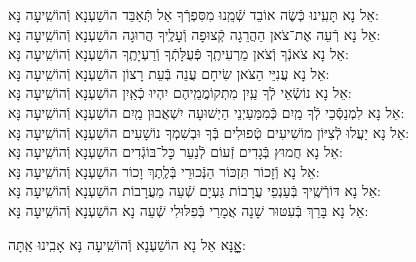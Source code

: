 \documentclass[twoside, openany, parskip=half, 11pt]{book}
\begin{document}
\begin{sometimes}
\begin{small}
אֵל נָא תָּעִֽינוּ כְּֿשֶׂה אוֹבֵד שְֿׁמֵֽנוּ מִסִּפְרְֿךָ אַל תְּֿאַבֵּד \hfill הוֹשַׁעְנָא וְֿהוֹשִֽׁיעָה נָּא: \\
אֵל נָא רְֿעֵה אֶת־צֹאן הַהֲרֵגָה קְֿצוּפָה וְֿעָלֶֽיךָ הֲרוּגָה \hfill הוֹשַׁעְנָא וְֿהוֹשִֽׁיעָה נָּא:\\
אֵל נָא צֹאנְֿךָ וְֿצֹאן מַרְעִיתֶֽךָ פְּֿעֻלָּתְֿךָ וְֿרַעְיָתֶֽךָ \hfill הוֹשַׁעְנָא וְֿהוֹשִֽׁיעָה נָּא:\\
אֵל נָא עֲנִיֵּי הַצֹּאן שִׂיחָם עֲנֵה בְּֿעֵת רָצוֹן \hfill הוֹשַׁעְנָא וְֿהוֹשִֽׁיעָה נָּא:\\
אֵל נָא נוֹשְֿׂאֵי לְֿךָ עַֽיִן מִתְקוֹמֲמֵֽיהֶם יִהְיוּ כְֿאַֽיִן \hfill הוֹשַׁעְנָא וְֿהוֹשִֽׁיעָה נָּא:\\
אֵל נָא לִמְנַסְּֿכֵי לְֿךָ מַֽיִם כְּֿמִמַּעַיְנֵי הַיְשׁוּעָה יִשְׁאֲבוּן מַֽיִם \hfill הוֹשַׁעְנָא וְֿהוֹשִֽׁיעָה נָּא:\\
אֵל נָא יַעֲלוּ לְֿצִיּוֹן מוֹשִׁיעִים טְֿפוּלִים בְּֿךָ וּבְשִׁמְךָ נוֹשָׁעִים \hfill הוֹשַׁעְנָא וְֿהוֹשִֽׁיעָה נָּא:\\
אֵל נָא חֲמוּץ בְּֿגָדִים זְֿעוֹם לְֿנַעֵר כׇּל־בּוֹגְֿדִים \hfill הוֹשַׁעְנָא וְֿהוֹשִֽׁיעָה נָּא:\\
אֵל נָא וְֿזָכוֹר תִּזְכּוֹר הַנְּֿכוּרֵי בְּֿלֶֽתֶךְ וָכוֹר \hfill הוֹשַׁעְנָא וְֿהוֹשִֽׁיעָה נָּא:\\
אֵל נָא דּוֹרְֿשֶֽׁיךָ בְּֿעַנְפֵי עֲרָבוֹת גַּעְיָם שְֿׁעֵה מֵעֲרָבוֹת \hfill הוֹשַׁעְנָא וְֿהוֹשִֽׁיעָה נָּא:\\
אֵל נָא בָּרֵךְ בְּֿעִטּוּר שָׁנָה אֲמָרַי בְּֿפִלּוּלִי שְֿׁעֵה נָא \hfill הוֹשַׁעְנָא וְֿהוֹשִֽׁיעָה נָּא:

\end{small}

\begin{large}
\shatzvkahal
 אׇׇׇׇָנָּא אֵל נָא הוֹשַׁעְנָא וְֿהוֹשִֽׁיעָה נָּא אָבִֽינוּ אַֽתָּה:

\end{large}


\end{sometimes}
\end{document}
